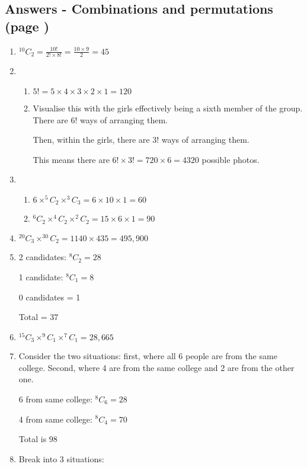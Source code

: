 \documentclass[../main.tex]{subfiles}
\begin{document}
\subsection*{Answers - Combinations and permutations (page \pageref{Combinations and permuations})}
\label{Combinations answers}
\begin{enumerate}
    \item
    \(^{10}C_2=\frac{10!}{2!\times 8!}=\frac{10\times 9}{2}=45\)
    \item 
        \begin{enumerate}
            \item 
            \(5!=5\times 4\times 3\times 2\times 1=120\)
            \item 
            Visualise this with the girls effectively being a sixth member of the group. There are \(6!\) ways of arranging them.

            Then, within the girls, there are \(3!\) ways of arranging them.

            This means there are \(6! \times 3!=720\times 6=4320\) possible photos.
        \end{enumerate}
    \item 
        \begin{enumerate}
            \item 
            \(6\times ^5C_2 \times ^3C_3 =6\times 10\times 1=60\)
            \item 
            \(^6C_2 \times ^4C_2 \times ^2C_2 = 15\times 6\times 1=90\)
        \end{enumerate}
    \item 
    \( ^{20}C_3\times ^{30}C_2 = 1140\times 435=495,900 \)
    \item 
    2 candidates: \(^8C_2 = 28\)

    1 candidate: \(^8C_1 = 8\)

    0 candidates  = 1

    Total = \(37\)
    \item 
    \(^{15}C_3 \times ^9C_1 \times ^7C_1 = 28,665\)
    \item 
    Consider the two situations: first, where all 6 people are from the same college. Second, where 4 are from the same college and 2 are from the other one.

    6 from same college: \(^8C_6=28\)

    4 from same college: \(^8C_4=70\)

    Total is \(98\)

    \item 
    Break into 3 situations: 


\end{enumerate}
\end{document}

